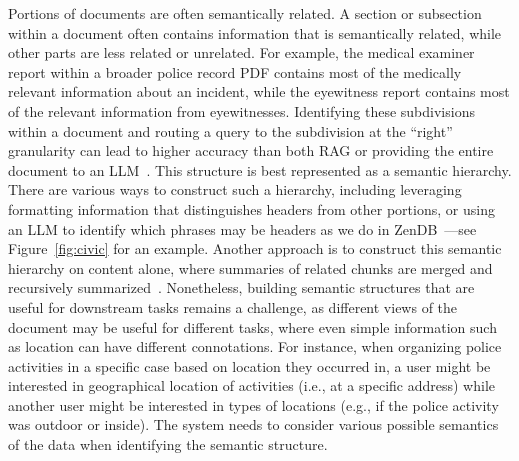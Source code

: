 Portions of documents are often semantically related. 
A section or subsection within a document often
contains information that is semantically related,
while other parts are less related or unrelated. 
For example, the medical examiner report within
a broader police record PDF contains
most of the medically relevant information
about an incident, while the eyewitness report
contains most of the relevant information from eyewitnesses.
Identifying these subdivisions within a document
and routing a query to the subdivision at the
``right'' granularity can lead to higher accuracy
than both RAG or providing the entire document to an LLM~\cite{lin2024towards}.
This structure is best represented
as a semantic hierarchy.
There are various ways to construct
such a hierarchy,
including leveraging formatting information
that distinguishes headers from other portions, 
or using an LLM to identify which phrases
may be headers as we do in ZenDB~\cite{lin2024towards}---see 
Figure~\ref{fig:civic} for an example.
Another approach is to construct this semantic hierarchy on
content alone, where summaries of related chunks are merged
and recursively summarized~\cite{sarthi2024raptor}.  
Nonetheless, building semantic structures 
that are useful for downstream tasks remains a challenge, 
as different views of the document may be useful for different tasks,
 where even simple information such as location can have different connotations. 
 For instance, when organizing police activities in a specific case based on location 
 they occurred in, a user might be interested in geographical location 
 of activities (i.e., at a specific address) 
 while another user might be interested in types of locations (e.g., if the police activity was outdoor or inside). 
 The system needs to consider various possible semantics of the data when identifying the semantic structure. 

